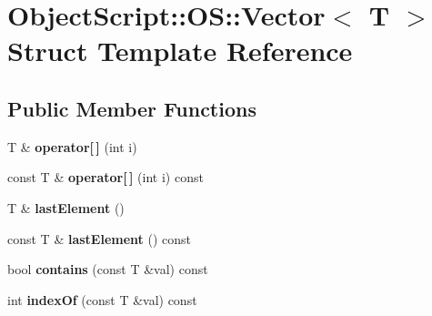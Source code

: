 \hypertarget{struct_object_script_1_1_o_s_1_1_vector}{}\section{Object\+Script\+:\+:OS\+:\+:Vector$<$ T $>$ Struct Template Reference}
\label{struct_object_script_1_1_o_s_1_1_vector}
\subsection*{Public Member Functions}
\begin{DoxyCompactItemize}
\item 
T \& {\bfseries operator\mbox{[}$\,$\mbox{]}} (int i)\hypertarget{struct_object_script_1_1_o_s_1_1_vector_ac233b54c64f78b59e9aa6a78e77c201a}{}\label{struct_object_script_1_1_o_s_1_1_vector_ac233b54c64f78b59e9aa6a78e77c201a}

\item 
const T \& {\bfseries operator\mbox{[}$\,$\mbox{]}} (int i) const \hypertarget{struct_object_script_1_1_o_s_1_1_vector_a3f0ca52fbd8b5dd03a085955ae4a6e27}{}\label{struct_object_script_1_1_o_s_1_1_vector_a3f0ca52fbd8b5dd03a085955ae4a6e27}

\item 
T \& {\bfseries last\+Element} ()\hypertarget{struct_object_script_1_1_o_s_1_1_vector_a0e140cb1c8f5af3403b839930f36e24d}{}\label{struct_object_script_1_1_o_s_1_1_vector_a0e140cb1c8f5af3403b839930f36e24d}

\item 
const T \& {\bfseries last\+Element} () const \hypertarget{struct_object_script_1_1_o_s_1_1_vector_a99153b28e856d71ee5342c2b9c552ebd}{}\label{struct_object_script_1_1_o_s_1_1_vector_a99153b28e856d71ee5342c2b9c552ebd}

\item 
bool {\bfseries contains} (const T \&val) const \hypertarget{struct_object_script_1_1_o_s_1_1_vector_aa62888bcfbcf0901a7e37f98c355e14f}{}\label{struct_object_script_1_1_o_s_1_1_vector_aa62888bcfbcf0901a7e37f98c355e14f}

\item 
int {\bfseries index\+Of} (const T \&val) const \hypertarget{struct_object_script_1_1_o_s_1_1_vector_aad34aa6649c9c6678179824c8e3bcef0}{}\label{struct_object_script_1_1_o_s_1_1_vector_aad34aa6649c9c6678179824c8e3bcef0}

\end{DoxyCompactItemize}
